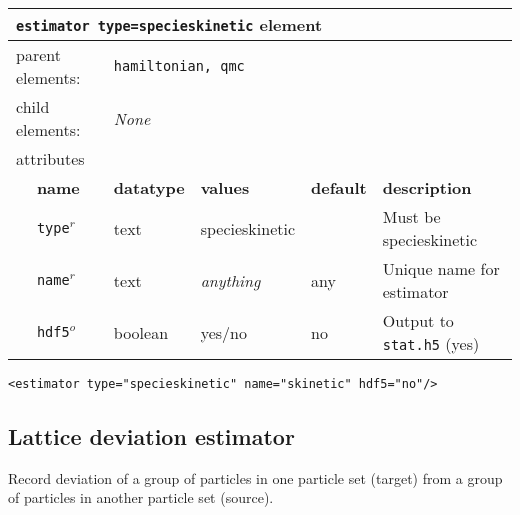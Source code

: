 \FloatBarrier
\begin{table}[h]
\begin{center}
\begin{tabularx}{\textwidth}{l l l l l l }
\hline
\multicolumn{6}{l}{\texttt{estimator type=specieskinetic} element} \\
\hline
\multicolumn{2}{l}{parent elements:} & \multicolumn{4}{l}{\texttt{hamiltonian, qmc}}\\
\multicolumn{2}{l}{child  elements:} & \multicolumn{4}{l}{\textit{None}}\\
\multicolumn{2}{l}{attributes}  & \multicolumn{4}{l}{}\\
   & \bfseries name       & \bfseries datatype & \bfseries values  & \bfseries default   & \bfseries description \\
   & \texttt{type}$^r$    &  text              & specieskinetic      &                     & Must be specieskinetic       \\
   & \texttt{name}$^r$    &  text              & \textit{anything} & any                 & Unique name for estimator \\
   & \texttt{hdf5}$^o$    &  boolean           & yes/no            & no                  & Output to \texttt{stat.h5} (yes) \\
  \hline
\end{tabularx}
\end{center}
\end{table}
\FloatBarrier


\begin{lstlisting}[caption=Species kinetic energy estimator element.]
  <estimator type="specieskinetic" name="skinetic" hdf5="no"/>
\end{lstlisting}



\subsection{Lattice deviation estimator}
Record deviation of a group of particles in one particle set (target) from a group of particles in another particle set (source).

